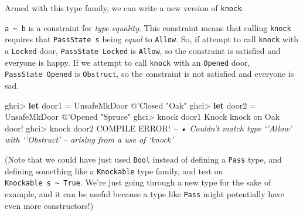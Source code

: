 \documentclass[]{article}
\newenvironment{Shaded}{}{}
\newcommand{\CommentTok}[1]{\textcolor[rgb]{0.38,0.63,0.69}{\textit{#1}}}
\newcommand{\DataTypeTok}[1]{\textcolor[rgb]{0.56,0.13,0.00}{#1}}
\newcommand{\FunctionTok}[1]{\textcolor[rgb]{0.02,0.16,0.49}{#1}}
\newcommand{\KeywordTok}[1]{\textcolor[rgb]{0.00,0.44,0.13}{\textbf{#1}}}
\newcommand{\NormalTok}[1]{#1}
\newcommand{\OtherTok}[1]{\textcolor[rgb]{0.00,0.44,0.13}{#1}}
\newcommand{\StringTok}[1]{\textcolor[rgb]{0.25,0.44,0.63}{#1}}
\begin{document}
Armed with this type family, we can write a new version of \texttt{knock}:

\begin{Shaded}
\end{Shaded}

\texttt{a\ \textasciitilde{}\ b} is a constraint for \emph{type equality}. This
constraint means that calling \texttt{knock} requires that \texttt{PassState\ s}
being \emph{equal} to \texttt{\textquotesingle{}Allow}. So, if attempt to call
\texttt{knock} with a \texttt{\textquotesingle{}Locked} door,
\texttt{PassState\ \textquotesingle{}Locked} is
\texttt{\textquotesingle{}Allow}, so the constraint is satisfied and everyone is
happy. If we attempt to call \texttt{knock} with an
\texttt{\textquotesingle{}Opened} door,
\texttt{PassState\ \textquotesingle{}Opened} is
\texttt{\textquotesingle{}Obstruct}, so the constraint is not satisfied and
everyone is sad.

\begin{Shaded}
\begin{Highlighting}[]
\NormalTok{ghci}\FunctionTok{>} \KeywordTok{let}\NormalTok{ door1 }\FunctionTok{=} \DataTypeTok{UnsafeMkDoor} \FunctionTok{@}\NormalTok{'}\DataTypeTok{Closed} \StringTok{"Oak"}
\NormalTok{ghci}\FunctionTok{>} \KeywordTok{let}\NormalTok{ door2 }\FunctionTok{=} \DataTypeTok{UnsafeMkDoor} \FunctionTok{@}\NormalTok{'}\DataTypeTok{Opened} \StringTok{"Spruce"}
\NormalTok{ghci}\FunctionTok{>}\NormalTok{ knock door1}
\DataTypeTok{Knock}\NormalTok{ knock on }\DataTypeTok{Oak}\NormalTok{ door}\FunctionTok{!}
\NormalTok{ghci}\FunctionTok{>}\NormalTok{ knock door2}
\DataTypeTok{COMPILE} \DataTypeTok{ERROR}\FunctionTok{!}
\CommentTok{--     • Couldn't match type ‘'Allow’ with ‘'Obstruct’}
\CommentTok{--             arising from a use of ‘knock’}
\end{Highlighting}
\end{Shaded}

(Note that we could have just used \texttt{Bool} instead of defining a
\texttt{Pass} type, and defining something like a \texttt{Knockable} type
family, and test on
\texttt{Knockable\ s\ \textasciitilde{}\ \textquotesingle{}True}. We're just
going through a new type for the sake of example, and it can be useful because a
type like \texttt{Pass} might potentially have even more constructors!)
\end{document}
